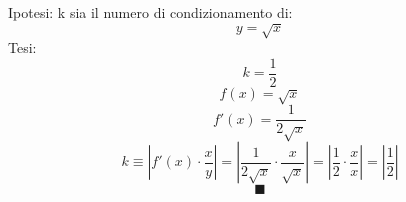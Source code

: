 Ipotesi: k sia il numero di condizionamento di:
\[
y = \sqrt{x}
\]
Tesi:
\[
k=\frac{1}{2}
\]
\[
f(x) = \sqrt{x}
\]
\[
f'(x) = \frac{1}{2\sqrt{x}}
\]
\[
k \equiv |f'(x) \cdot \frac{x}{y} | = | \frac{1}{2\sqrt{x}} \cdot \frac{x}{ \sqrt{x} } | = | \frac{1}{2} \cdot \frac{x}{x} | = | \frac{1}{2}|
\]
\[ \blacksquare \]
